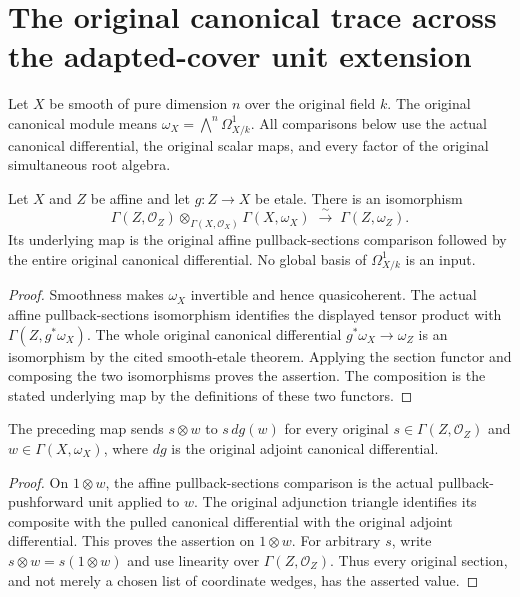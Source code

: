 \section{The original canonical trace across the adapted-cover unit extension}

Let $X$ be smooth of pure dimension $n$ over the original field $k$.
The original canonical module means $\omega_X=\bigwedge^n\Omega^1_{X/k}$.
All comparisons below use the actual canonical differential, the original
scalar maps, and every factor of the original simultaneous root algebra.

\begin{lemma}
\label{lem:kn-global-trace-canonical-affine-basechange}
\leanok
{}
Let $X$ and $Z$ be affine and let $g:Z\to X$ be etale.  There is an
isomorphism
\[
 \Gamma(Z,\mathcal O_Z)\otimes_{\Gamma(X,\mathcal O_X)}
       \Gamma(X,\omega_X)\;\xrightarrow{\sim}\;
       \Gamma(Z,\omega_Z).
\]
Its underlying map is the original affine pullback-sections comparison
followed by the entire original canonical differential.  No global basis
of $\Omega^1_{X/k}$ is an input.
\end{lemma}
\begin{proof}
Smoothness makes $\omega_X$ invertible and hence quasicoherent.  The actual
affine pullback-sections isomorphism identifies the displayed tensor
product with $\Gamma(Z,g^*\omega_X)$.  The whole original canonical
differential $g^*\omega_X\to\omega_Z$ is an isomorphism by the cited
smooth-etale theorem.  Applying the section functor and composing the two
isomorphisms proves the assertion.  The composition is the stated
underlying map by the definitions of these two functors.
\end{proof}

\begin{lemma}
\label{lem:kn-global-trace-canonical-affine-unit}
\leanok
{}
The preceding map sends $s\otimes w$ to $s\,dg(w)$ for every original
$s\in\Gamma(Z,\mathcal O_Z)$ and $w\in\Gamma(X,\omega_X)$, where $dg$ is
the original adjoint canonical differential.
\end{lemma}
\begin{proof}
On $1\otimes w$, the affine pullback-sections comparison is the actual
pullback-pushforward unit applied to $w$.  The original adjunction triangle
identifies its composite with the pulled canonical differential with the
original adjoint differential.  This proves the assertion on $1\otimes w$.
For arbitrary $s$, write $s\otimes w=s(1\otimes w)$ and use linearity over
$\Gamma(Z,\mathcal O_Z)$.  Thus every original section, and not merely a
chosen list of coordinate wedges, has the asserted value.
\end{proof}

